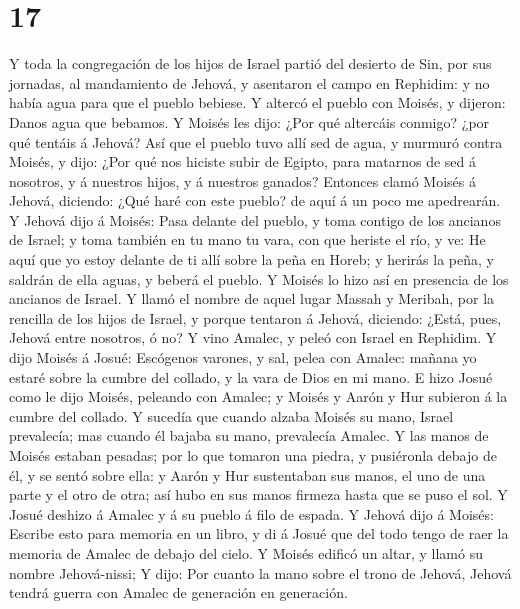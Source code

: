 \hypertarget{section-16}{%
\section{17}\label{section-16}}

 Y toda la congregación de los hijos de Israel partió del
desierto de Sin, por sus jornadas, al mandamiento de Jehová, y asentaron
el campo en Rephidim: y no había agua para que el pueblo bebiese.
 Y altercó el pueblo con Moisés, y dijeron: Danos agua que
bebamos. Y Moisés les dijo: ¿Por qué altercáis conmigo? ¿por qué tentáis
á Jehová?  Así que el pueblo tuvo allí sed de agua, y
murmuró contra Moisés, y dijo: ¿Por qué nos hiciste subir de Egipto,
para matarnos de sed á nosotros, y á nuestros hijos, y á nuestros
ganados?  Entonces clamó Moisés á Jehová, diciendo: ¿Qué
haré con este pueblo? de aquí á un poco me apedrearán.  Y
Jehová dijo á Moisés: Pasa delante del pueblo, y toma contigo de los
ancianos de Israel; y toma también en tu mano tu vara, con que heriste
el río, y ve:  He aquí que yo estoy delante de ti allí sobre
la peña en Horeb; y herirás la peña, y saldrán de ella aguas, y beberá
el pueblo. Y Moisés lo hizo así en presencia de los ancianos de Israel.
 Y llamó el nombre de aquel lugar Massah y Meribah, por la
rencilla de los hijos de Israel, y porque tentaron á Jehová, diciendo:
¿Está, pues, Jehová entre nosotros, ó no?  Y vino Amalec, y
peleó con Israel en Rephidim.  Y dijo Moisés á Josué:
Escógenos varones, y sal, pelea con Amalec: mañana yo estaré sobre la
cumbre del collado, y la vara de Dios en mi mano.  E hizo
Josué como le dijo Moisés, peleando con Amalec; y Moisés y Aarón y Hur
subieron á la cumbre del collado.  Y sucedía que cuando
alzaba Moisés su mano, Israel prevalecía; mas cuando él bajaba su mano,
prevalecía Amalec.  Y las manos de Moisés estaban pesadas;
por lo que tomaron una piedra, y pusiéronla debajo de él, y se sentó
sobre ella: y Aarón y Hur sustentaban sus manos, el uno de una parte y
el otro de otra; así hubo en sus manos firmeza hasta que se puso el sol.
 Y Josué deshizo á Amalec y á su pueblo á filo de espada.
 Y Jehová dijo á Moisés: Escribe esto para memoria en un
libro, y di á Josué que del todo tengo de raer la memoria de Amalec de
debajo del cielo.  Y Moisés edificó un altar, y llamó su
nombre Jehová-nissi;  Y dijo: Por cuanto la mano sobre el
trono de Jehová, Jehová tendrá guerra con Amalec de generación en
generación.

